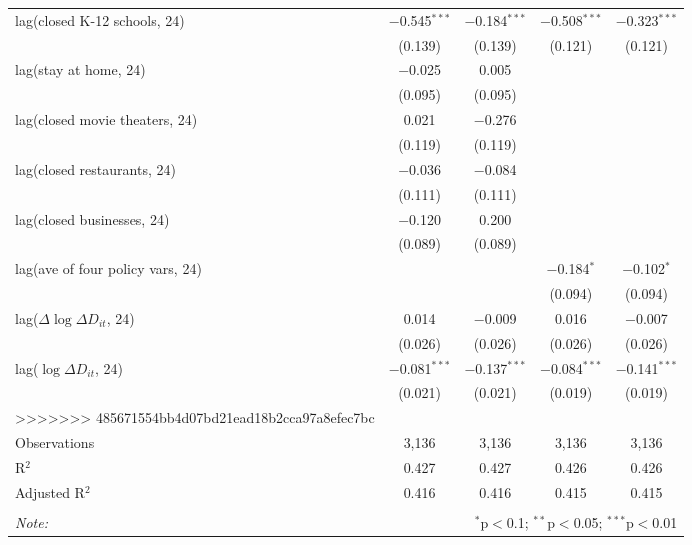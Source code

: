 \begin{tabular}{@{\extracolsep{1pt}}lcccc}
  lag(closed K-12 schools, 24) & $-$0.545$^{***}$ & $-$0.184$^{***}$ & $-$0.508$^{***}$ & $-$0.323$^{***}$ \\ 
  & (0.139) & (0.139) & (0.121) & (0.121) \\ 
  lag(stay at home, 24) & $-$0.025 & 0.005 &  &  \\ 
  & (0.095) & (0.095) &  &  \\ 
  lag(closed movie theaters, 24) & 0.021 & $-$0.276 &  &  \\ 
  & (0.119) & (0.119) &  &  \\ 
  lag(closed restaurants, 24) & $-$0.036 & $-$0.084 &  &  \\ 
  & (0.111) & (0.111) &  &  \\ 
  lag(closed businesses, 24) & $-$0.120 & 0.200 &  &  \\ 
  & (0.089) & (0.089) &  &  \\ 
  lag(ave of four policy vars, 24) &  &  & $-$0.184$^{*}$ & $-$0.102$^{*}$ \\ 
  &  &  & (0.094) & (0.094) \\ 
  lag($\Delta \log \Delta D_{it}$, 24) & 0.014 & $-$0.009 & 0.016 & $-$0.007 \\ 
  & (0.026) & (0.026) & (0.026) & (0.026) \\ 
  lag($\log \Delta D_{it}$, 24) & $-$0.081$^{***}$ & $-$0.137$^{***}$ & $-$0.084$^{***}$ & $-$0.141$^{***}$ \\ 
  & (0.021) & (0.021) & (0.019) & (0.019) \\ 
>>>>>>> 485671554bb4d07bd21ead18b2cca97a8efec7bc
 \hline \\[-1.8ex] 
Observations & 3,136 & 3,136 & 3,136 & 3,136 \\ 
R$^{2}$ & 0.427 & 0.427 & 0.426 & 0.426 \\ 
Adjusted R$^{2}$ & 0.416 & 0.416 & 0.415 & 0.415 \\ 
\hline 
\hline \\[-1.8ex] 
\textit{Note:}  & \multicolumn{4}{r}{$^{*}$p$<$0.1; $^{**}$p$<$0.05; $^{***}$p$<$0.01} \\ 
\end{tabular} 